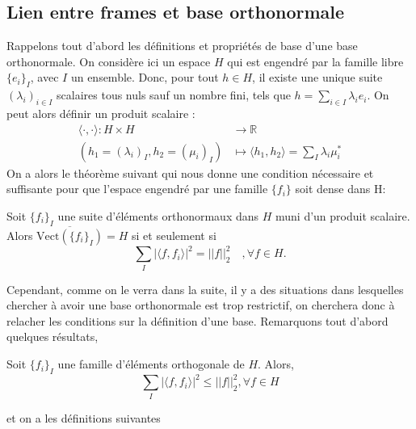 \subsection{Lien entre frames et base orthonormale}
Rappelons tout d'abord les définitions et propriétés de base d'une base orthonormale. On considère ici un espace $H$ qui est engendré par la famille libre $\{e_i\}_I$, avec $I$ un ensemble.
Donc, pour tout $h \in H$, il existe une unique suite $(\lambda_i)_{i \in I}$ scalaires tous nuls sauf un nombre fini, tels que $ h = \sum_{i \in I} \lambda_i e_i$.
On peut alors définir un produit scalaire : 
\begin{align}
	\langle \cdot, \cdot \rangle :  H \times H &\to \mathbb{R} \\
		(h_1= (\lambda_i)_I, h_2 = (\mu_i)_I) &\mapsto \langle h_1, h_2 \rangle = \sum_I \lambda_i \mu_i^*
\end{align}
On a alors le théorème suivant qui nous donne une condition nécessaire et suffisante pour que l'espace engendré par une famille $\{f_i\}$ soit dense dans H:
\begin{theoreme}
	Soit $\{f_i\}_I$ une suite d'éléments orthonormaux dans $H$ muni d'un produit scalaire.
	Alors $\overline{\text{Vect}(\{f_i\}_I)} = H$ si et seulement si 
	\begin{equation*}
		\sum_I |\langle f, f_i \rangle |^2 = ||f||_2 ^2 \quad, \forall f \in H.
	\end{equation*}
\end{theoreme}
Cependant, comme on le verra dans la suite, il y a des situations dans lesquelles chercher à avoir une base orthonormale est trop restrictif, on cherchera donc à relacher les conditions sur la définition d'une base.
\newline
Remarquons tout d'abord quelques résultats,
\begin{theoreme}
	Soit $\{f_i\}_I$ une famille d'éléments orthogonale de $H$.
	Alors,
	\begin{equation*}
		\sum_I |\langle f, f_i \rangle|^2 \leq ||f||_2 ^2, \forall f \in H
	\end{equation*}
\end{theoreme}
et on a les définitions suivantes
